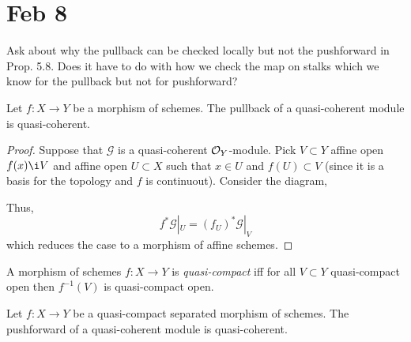 \documentclass[12pt]{article}
\begin{document}
\section{Feb 8}

Ask about why the pullback can be checked locally but not the pushforward in Prop. 5.8. Does it have to do with how we check the map on stalks which we know for the pullback but not for pushforward?

\begin{lemma}
Let $f : X \to Y$ be a morphism of schemes. The pullback of a quasi-coherent module is quasi-coherent.
\end{lemma}

\begin{proof} 
Suppose that $\mathcal{G}$ is a quasi-coherent $\mathcal{O}_{Y}$-module. Pick $V \subset Y$ affine open $f(x) \i V$ and affine open $U \subset X$ such that $x \in U$ and $f(U) \subset V$ (since it is a basis for the topology and $f$ is continuout). Consider the diagram,
\begin{center}
\end{center} 
Thus,
\[ f^* \mathcal{G}|_U = (f_U)^* \mathcal{G}|_V \]
which reduces the case to a morphism of affine schemes. 
\end{proof}

\begin{definition}
A morphism of schemes $f : X \to Y$ is \textit{quasi-compact} iff for all $V \subset Y$ quasi-compact open then $f^{-1}(V)$ is quasi-compact open. 
\end{definition}

\begin{lemma}
Let $f : X \to Y$ be a quasi-compact separated morphism of schemes. The pushforward of a quasi-coherent module is quasi-coherent.
\end{lemma}
\end{document}
